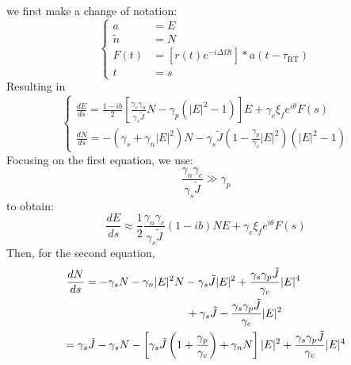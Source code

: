 %
we first make a change of notation:
%
\begin{equation*}
\left\{\begin{aligned}
a & =E \\
\tilde{n} & =N \\
F(t) & =\left[r(t) e^{-i \Delta \Omega t}\right] * a\left(t-\tau_\text{RT}\right) \\
t & =s
\end{aligned}\right.
\end{equation*}
%
Resulting in
%
\begin{equation*}
\left\{\begin{array}{l}
\displaystyle \frac{d E}{d s}=\frac{1-ib}{2}\left[\frac{\gamma_{c} \gamma_{n}}{\gamma_{s} \tilde{J}} N-\gamma_{p}\left(|E|^{2}-1\right)\right] E+\gamma_{c} \xi_{f} e^{i\theta} F(s) \\
\displaystyle \frac{d N}{d s}=-\left(\gamma_{s}+\gamma_{n}|E|^{2}\right) N-\gamma_{s} \tilde{J}\left(1-\frac{\gamma_{p}}{\gamma_{c}}|E|^{2}\right)\left(|E|^{2}-1\right)
\end{array}\right.
\end{equation*}
%
Focusing on the first equation, we use:
%
\begin{equation*}
    \frac{\gamma_{n}\gamma_{c}}{\gamma_{s} \tilde{J}} \gg \gamma_{p}
\end{equation*}
%
to obtain:
%
\begin{equation*}
    \frac{d E}{d s} \approx \frac{1}{2} \frac{\gamma_n \gamma_c}{\gamma_{s} \tilde{J}}(1-ib) N E+ \gamma_c \xi_{f} e^{i\theta} F(s)
\end{equation*}
%
Then, for the second equation,
%
\begin{align*}
\displaystyle \frac{d N}{d s} &= -\gamma_s N - \gamma_n|E|^{2} N - \gamma_s \tilde{J}|E|^2 + \frac{\gamma_s \gamma_p \tilde{J}} {\gamma_{c}}|E|^{4}\\
&\hspace{3.2cm} + \gamma_{s} \tilde{J} - \frac{\gamma_{s} \gamma_{p} \tilde{J}}{\gamma_{c}}|E|^{2}\\
&\hspace{-0.7cm} =\gamma_{s} \tilde{J}-\gamma_{s} N-\left[\gamma_{s} \tilde{J}\left(1+\frac{\gamma_{p}}{\gamma_{c}}\right)+\gamma_{n} N\right]|E|^{2}+\frac{\gamma_{s} \gamma_{p} \tilde{J}}{\gamma_{c}}|E|^{4}
\end{align*}

